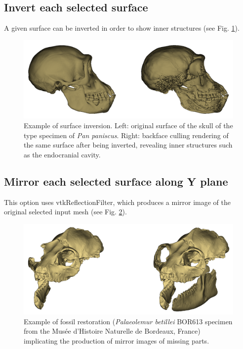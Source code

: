 \subsection{Invert each selected surface}

A given surface can be inverted in order to show inner structures (see Fig. \ref{inversion}).\\


\begin{figure}
  \centering
  \includegraphics[scale=0.32]{images/09/structure/inversion_example.png} 
	\caption{Example of surface inversion. Left: original surface of the skull of the type specimen of \textit{Pan paniscus}.
Right: backface culling rendering of the same surface after being inverted, revealing inner structures such as the endocranial cavity. }
\label{inversion}
 
\end{figure}

\subsection{Mirror each selected surface along Y plane}

This option uses vtkReflectionFilter, which produces a mirror image of the original selected input mesh (see Fig. \ref{mirror}).\\

\begin{figure}
  \centering
  \includegraphics[scale=0.32]{images/09/structure/image_mirror.png} 
	\caption{Example of fossil restoration (\textit{Palaeolemur betillei} BOR613 specimen from the Musée d'Histoire Naturelle de Bordeaux, France) implicating the production of mirror images of missing parts.}
 \label{mirror}
\end{figure}







